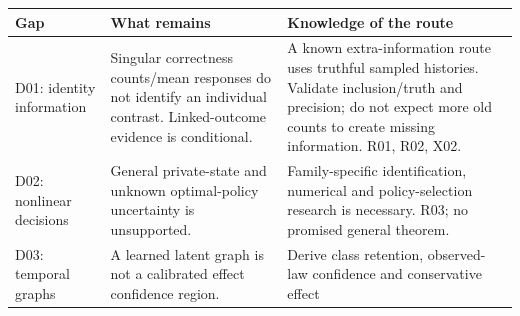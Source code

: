 \documentclass[
  11pt,
  a4paper,
]{article}
\begin{document}
\begin{longtable}[]{@{}lll@{}}
\toprule
\begin{minipage}[b]{0.30\columnwidth}\raggedright
Gap\strut
\end{minipage} & \begin{minipage}[b]{0.30\columnwidth}\raggedright
What remains\strut
\end{minipage} & \begin{minipage}[b]{0.30\columnwidth}\raggedright
Knowledge of the route\strut
\end{minipage}\tabularnewline
\midrule
\endhead
\begin{minipage}[t]{0.30\columnwidth}\raggedright
D01: identity information\strut
\end{minipage} & \begin{minipage}[t]{0.30\columnwidth}\raggedright
Singular correctness counts/mean responses do not identify an individual
contrast. Linked-outcome evidence is conditional.\strut
\end{minipage} & \begin{minipage}[t]{0.30\columnwidth}\raggedright
A known extra-information route uses truthful sampled histories.
Validate inclusion/truth and precision; do not expect more old counts to
create missing information. R01, R02, X02.\strut
\end{minipage}\tabularnewline
\begin{minipage}[t]{0.30\columnwidth}\raggedright
D02: nonlinear decisions\strut
\end{minipage} & \begin{minipage}[t]{0.30\columnwidth}\raggedright
General private-state and unknown optimal-policy uncertainty is
unsupported.\strut
\end{minipage} & \begin{minipage}[t]{0.30\columnwidth}\raggedright
Family-specific identification, numerical and policy-selection research
is necessary. R03; no promised general theorem.\strut
\end{minipage}\tabularnewline
\begin{minipage}[t]{0.30\columnwidth}\raggedright
D03: temporal graphs\strut
\end{minipage} & \begin{minipage}[t]{0.30\columnwidth}\raggedright
A learned latent graph is not a calibrated effect confidence
region.\strut
\end{minipage} & \begin{minipage}[t]{0.30\columnwidth}\raggedright
Derive class retention, observed-law confidence and conservative effect

\end{minipage}
\end{longtable}
\end{document}
